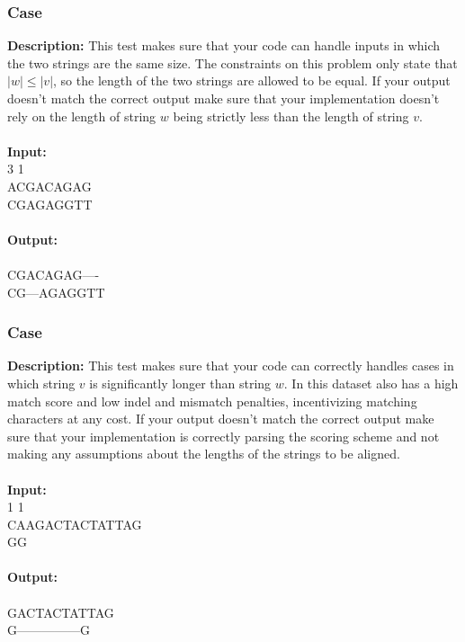 \documentclass{article}
\newcommand{\code}[1]{{\fontfamily{pcr}\selectfont #1}}
\begin{document}
\subsubsection*{Case }
\hline \vspace{5}
\textbf{Description:} This test makes sure that your code can handle inputs in which the two strings are the same size. The constraints on this problem only state that $|w|\leq|v|$, so the length of the two strings are allowed to be equal. If your output doesn’t match the correct output make sure that your implementation doesn’t rely on the length of string $w$ being strictly less than the length of string $v$.\\ \\
\noindent \textbf{Input:}\\
\code{2 3 1\\ACGACAGAG\\CGAGAGGTT}\\ \\
\noindent \textbf{Output:}\\
\code{7\\CGACAGAG----\\CG---AGAGGTT}

\subsubsection*{Case }
\hline \vspace{5}
\textbf{Description:} This test makes sure that your code can correctly handles cases in which string $v$ is significantly longer than string $w$. In this dataset also has a high match score and low indel and mismatch penalties, incentivizing matching characters at any cost. If your output doesn’t match the correct output make sure that your implementation is correctly parsing the scoring scheme and not making any assumptions about the lengths of the strings to be aligned.\\ \\
\noindent \textbf{Input:}\\
\code{10 1 1\\CAAGACTACTATTAG\\GG}\\ \\
\noindent \textbf{Output:}\\
\code{10\\GACTACTATTAG\\G---------------G}
\end{document}
